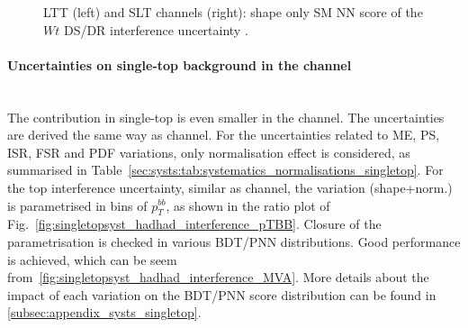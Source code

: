 \begin{figure}
  \centering
  \caption{LTT (left) and SLT channels (right): shape only SM NN score of the $Wt$ DS/DR interference uncertainty .}
  \label{fig:singletopsyst_lephad_interference_NN}
  \end{figure}


\paragraph{Uncertainties on single-top background in the \hadhad channel}\mbox{}\\

The contribution in single-top is even smaller in the \hadhad channel. 
The uncertainties are derived the same way as \lephad channel.
For the uncertainties related to ME, PS, ISR, FSR and PDF variations, only normalisation effect is considered, as summarised in Table~\ref{sec:systs:tab:systematics_normalisations_singletop}. 
For the top interference uncertainty, similar as \lephad channel, the variation (shape+norm.) is parametrised in bins of $p_T^{bb}$, as shown in the ratio plot of Fig.~\ref{fig:singletopsyst_hadhad_interference_pTBB}. Closure of the parametrisation is checked in various BDT/PNN distributions. Good performance is achieved, which can be seem from~\ref{fig:singletopsyst_hadhad_interference_MVA}.
More details about the impact of each variation on the BDT/PNN score distribution can be found in \ref{subsec:appendix_systs_singletop}.

